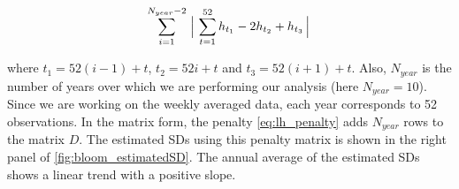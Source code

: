 \documentclass{article}
\begin{document}
\begin{equation}
\sum_{i=1}^{N_{year}-2} \Big\arrowvert \sum_{t=1}^{52} h_{t_1}-2h_{t_2}+h_{t_3}  \Big\arrowvert
\label{eq:lh_penalty}
\end{equation}

where $t_1=52(i-1)+t$, $t_2=52i+t$ and $t_3=52(i+1)+t$. Also,
$N_{year}$ is the number of years over which we are performing our
analysis (here $N_{year}=10$). Since we are working on the weekly
averaged data, each year corresponds to 52 observations. In the matrix
form, the penalty \eqref{eq:lh_penalty} adds $N_{year}$ rows to the
matrix $D$. The estimated SDs using this penalty matrix is shown in
the right panel of \autoref{fig:bloom_estimatedSD}. The annual average
of the estimated SDs shows a linear trend with a positive slope. 


\small

\end{document}
